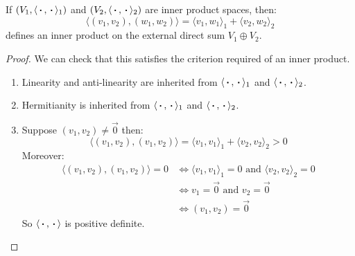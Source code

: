 \documentclass[../main.tex]{subfiles}
\begin{document}
\begin{definition}
  If $(V_1, \langle {\hspace{0.18em}\boldsymbol{\cdot}\hspace{0.18em}}, {\hspace{0.18em}\boldsymbol{\cdot}\hspace{0.18em}} \rangle_1)$ and $(V_2, \langle {\hspace{0.18em}\boldsymbol{\cdot}\hspace{0.18em}}, {\hspace{0.18em}\boldsymbol{\cdot}\hspace{0.18em}} \rangle_2)$ are inner product spaces, then:
  \[
    \langle (v_1, v_2), (w_1, w_2) \rangle = \langle v_1, w_1 \rangle_1 + \langle v_2, w_2 \rangle_2
  \]
  defines an inner product on the external direct sum $V_1 \oplus V_2$.
\end{definition}
\begin{proof}
  We can check that this satisfies the criterion required of an inner product.
  \begin{enumerate}
    \item Linearity and anti-linearity are inherited from $\langle {\hspace{0.18em}\boldsymbol{\cdot}\hspace{0.18em}}, {\hspace{0.18em}\boldsymbol{\cdot}\hspace{0.18em}} \rangle_1$ and $\langle {\hspace{0.18em}\boldsymbol{\cdot}\hspace{0.18em}}, {\hspace{0.18em}\boldsymbol{\cdot}\hspace{0.18em}} \rangle_2$.
    \item Hermitianity is inherited from $\langle {\hspace{0.18em}\boldsymbol{\cdot}\hspace{0.18em}}, {\hspace{0.18em}\boldsymbol{\cdot}\hspace{0.18em}} \rangle_1$ and $\langle {\hspace{0.18em}\boldsymbol{\cdot}\hspace{0.18em}}, {\hspace{0.18em}\boldsymbol{\cdot}\hspace{0.18em}} \rangle_2$.
    \item Suppose $(v_1, v_2) \neq \vec{0}$ then:
      \[
        \langle (v_1, v_2), (v_1, v_2) \rangle = \langle v_1, v_1 \rangle_1 + \langle v_2, v_2 \rangle_2 > 0
      \]
      Moreover:
      \begin{align*}
        \langle (v_1, v_2), (v_1, v_2) \rangle = 0 &\iff \langle v_1, v_1 \rangle_1 = 0 \text{ and } \langle v_2, v_2 \rangle_2 = 0 \\
                                                   &\iff v_1 = \vec{0} \text{ and } v_2 = \vec{0} \\
                                                   &\iff (v_1, v_2) = \vec{0}
      \end{align*}
      So $\langle {\hspace{0.18em}\boldsymbol{\cdot}\hspace{0.18em}}, {\hspace{0.18em}\boldsymbol{\cdot}\hspace{0.18em}} \rangle$ is positive definite.
  \end{enumerate}
\end{proof}
\end{document}
